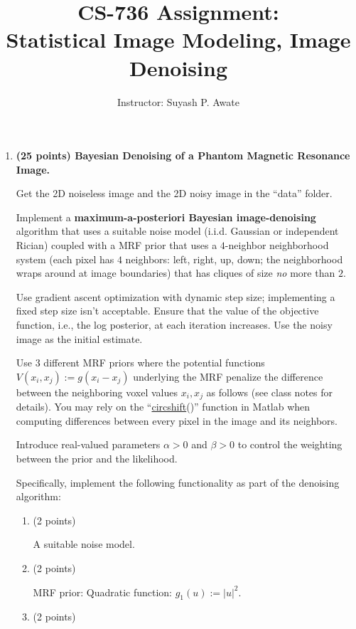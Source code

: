\documentclass[12pt]{article}
\title {CS-736 Assignment: \\ Statistical Image Modeling, Image Denoising}
\author {Instructor: Suyash P. Awate}
\date {}
\begin{document}
\maketitle

\setlength{\parindent}{0cm}

\begin {enumerate}
  
\item {\bf (25 points) Bayesian Denoising of a Phantom Magnetic Resonance Image.}
  
  Get the 2D noiseless image and the 2D noisy image in the ``data'' folder.
  
  Implement a {\bf maximum-a-posteriori Bayesian image-denoising} algorithm that uses a suitable noise model
  (i.i.d. Gaussian or independent Rician) coupled with a MRF prior that uses a $4$-neighbor neighborhood
  system (each pixel has $4$ neighbors: left, right, up, down; the neighborhood wraps around at image
  boundaries) that has cliques of size {\em no} more than $2$.
  
  Use gradient ascent optimization with dynamic step size; implementing a fixed step size isn't
  acceptable. Ensure that the value of the objective function, i.e., the log posterior, at each iteration
  increases. Use the noisy image as the initial estimate.
  
  Use $3$ different MRF priors where the potential functions $V (x_i, x_j) := g (x_i - x_j)$ underlying the
  MRF penalize the difference between the neighboring voxel values $x_i,x_j$ as follows (see class notes for
  details). You may rely on the
  ``\href{https://in.mathworks.com/help/matlab/ref/circshift.html}{circshift}()'' function in Matlab when
  computing differences between every pixel in the image and its neighbors.
  
  Introduce real-valued parameters $\alpha > 0$ and $\beta > 0$ to control the weighting between the prior and
  the likelihood.
  
  Specifically, implement the following functionality as part of the denoising algorithm:
  \begin {enumerate}
  \item (2 points)

    A suitable noise model.

  \item (2 points)

    MRF prior: Quadratic function: $g_1 (u) := |u|^2$.
    
  \item (2 points)
    

\end{enumerate}
\end{enumerate}
\end{document}
